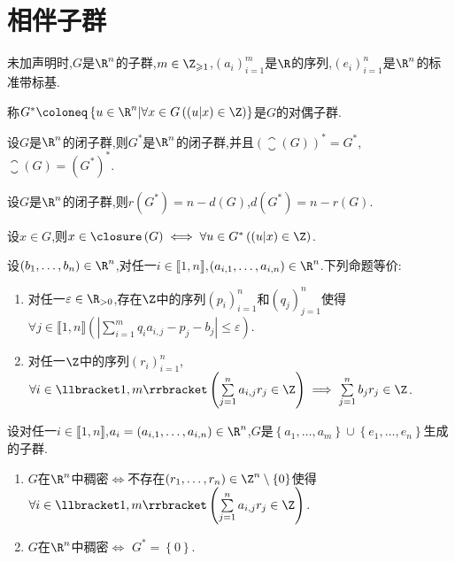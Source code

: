 \section{相伴子群}

未加声明时,$G$是$\R^{n}$的子群,$m\in\Z_{\geqslant 1}$,$\left(a_{i}\right)_{i=1}^{m}$是$\R$的序列,$\left(e_{i}\right)_{i=1}^{n}$是$\R^{n}$的标准带标基.

\begin{definition}{}{}
	称$G^{\ast}\coloneq\left\{u\in\R^{n}\middle|\forall x\in G\left(\left(u\middle|x\right)\in\Z\right)\right\}$是$G$的对偶子群.
\end{definition}

\begin{proposition}{}{}
	设$G$是$\R^{n}$的闭子群,则$G^{\ast}$是$\R^{n}$的闭子群,并且$\left(\closure\left(G\right)\right)^{\ast}=G^{\ast}$,$\closure\left(G\right)=\left(G^{\ast}\right)^{\ast}$.
\end{proposition}

\begin{proposition}{}{}
	设$G$是$\R^{n}$的闭子群,则$r\left(G^{\ast}\right)=n-d\left(G\right)$,$d\left(G^{\ast}\right)=n-r\left(G\right)$.
\end{proposition}

\begin{corollary}{}{}
	设$x\in G$,则$x\in\closure\left(G\right)\iff\forall u\in G^{\ast}\left(\left(u\middle|x\right)\in\Z\right)$.
\end{corollary}

\begin{theorem}{}{}
	设$\left(b_{1},\ldots,b_{n}\right)\in\R^{n}$,对任一$i\in\llbracket 1,n\rrbracket$,$\left(a_{i,1},\ldots,a_{i,n}\right)\in\R^{n}$.下列命题等价:
	\begin{enumerate}
		\item 对任一$\varepsilon\in\R_{>0}$,存在$\Z$中的序列$\left(p_{i}\right)_{i=1}^{n}$和$\left(q_{j}\right)_{j=1}^{n}$使得$\forall j\in\llbracket 1,n\rrbracket\left(\left|\sum\limits_{i=1}^{m}q_{i}a_{i,j}-p_{j}-b_{j}\right|\leqslant\varepsilon\right)$.
		\item 对任一$\Z$中的序列$\left(r_{i}\right)_{i=1}^{n}$,$\forall i\in\llbracket 1,m\rrbracket\left(\sum\limits_{j=1}^{n}a_{i,j}r_{j}\in\Z\right)\implies\sum\limits_{j=1}^{n}b_{j}r_{j}\in\Z$.
	\end{enumerate}
\end{theorem}

\begin{corollary}{}{}
	设对任一$i\in\llbracket 1,n\rrbracket$,$a_{i}=\left(a_{i,1},\ldots,a_{i,n}\right)\in\R^{n}$,$G$是$\left\{a_{1},\ldots,a_{m}\right\}\cup\left\{e_{1},\ldots,e_{n}\right\}$生成的子群.
	\begin{enumerate}
		\item $G$在$\R^{n}$中稠密$\iff$不存在$\left(r_{1},\ldots,r_{n}\right)\in\Z^{n}\setminus\left\{0\right\}$使得$\forall i\in\llbracket 1,m\rrbracket\left(\sum\limits_{j=1}^{n}a_{i,j}r_{j}\in\Z\right)$.
		\item $G$在$\R^{n}$中稠密$\iff$ $G^{\ast}=\left\{0\right\}$.
	\end{enumerate}
\end{corollary}

